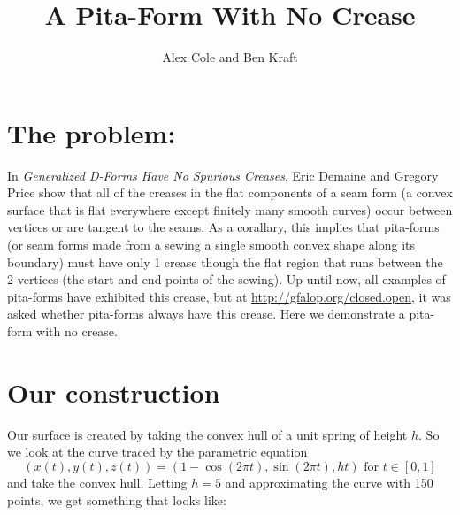 \documentclass[12pt]{article}
\title{A Pita-Form With No Crease}
\author{Alex Cole and Ben Kraft}
\begin{document}
\maketitle

\section{The problem:}
In \textit{Generalized D-Forms Have No Spurious Creases}, Eric Demaine and Gregory Price show that all of the creases in the flat components of a seam form (a convex surface that is flat everywhere except finitely many smooth curves) occur between vertices or are tangent to the seams. As a corallary, this implies that pita-forms (or seam forms made from a sewing a single smooth convex shape along its boundary) must have only 1 crease though the flat region that runs between the 2 vertices (the start and end points of the sewing). Up until now, all examples of pita-forms have exhibited this crease, but at \url{http://gfalop.org/closed.open}, it was asked whether pita-forms always have this crease. Here we demonstrate a pita-form with no crease.

\section{Our construction}
Our surface is created by taking the convex hull of a unit spring of height $h$. So we look at the curve traced by the parametric equation 
$$(x(t), y(t), z(t)) = \left(1-\cos(2\pi t), \sin(2\pi t), ht \right) \text{ for } t \in [0, 1]$$
and take the convex hull. Letting $h=5$ and approximating the curve with 150 points, we get something that looks like:
\end{document}
